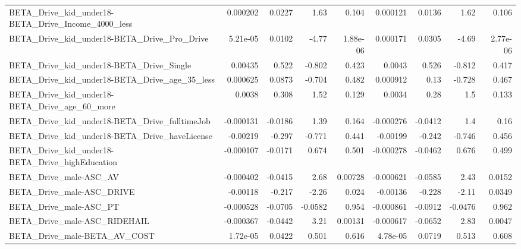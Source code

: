 \begin{tabular}{lrrrrrrrr}
BETA\_Drive\_kid\_under18-BETA\_Drive\_Income\_4000\_less &    0.000202 &       0.0227 &      1.63 &    0.104 &   0.000121 &      0.0136 &         1.62 &         0.106 \\
BETA\_Drive\_kid\_under18-BETA\_Drive\_Pro\_Drive        &    5.21e-05 &       0.0102 &     -4.77 & 1.88e-06 &   0.000171 &      0.0305 &        -4.69 &      2.77e-06 \\
BETA\_Drive\_kid\_under18-BETA\_Drive\_Single           &     0.00435 &        0.522 &    -0.802 &    0.423 &     0.0043 &       0.526 &       -0.812 &         0.417 \\
BETA\_Drive\_kid\_under18-BETA\_Drive\_age\_35\_less      &    0.000625 &       0.0873 &    -0.704 &    0.482 &   0.000912 &        0.13 &       -0.728 &         0.467 \\
BETA\_Drive\_kid\_under18-BETA\_Drive\_age\_60\_more      &      0.0038 &        0.308 &      1.52 &    0.129 &     0.0034 &        0.28 &          1.5 &         0.133 \\
BETA\_Drive\_kid\_under18-BETA\_Drive\_fulltimeJob      &   -0.000131 &      -0.0186 &      1.39 &    0.164 &  -0.000276 &     -0.0412 &          1.4 &          0.16 \\
BETA\_Drive\_kid\_under18-BETA\_Drive\_haveLicense      &    -0.00219 &       -0.297 &    -0.771 &    0.441 &   -0.00199 &      -0.242 &       -0.746 &         0.456 \\
BETA\_Drive\_kid\_under18-BETA\_Drive\_highEducation    &   -0.000107 &      -0.0171 &     0.674 &    0.501 &  -0.000278 &     -0.0462 &        0.676 &         0.499 \\
BETA\_Drive\_male-ASC\_AV                             &   -0.000402 &      -0.0415 &      2.68 &  0.00728 &  -0.000621 &     -0.0585 &         2.43 &        0.0152 \\
BETA\_Drive\_male-ASC\_DRIVE                          &    -0.00118 &       -0.217 &     -2.26 &    0.024 &   -0.00136 &      -0.228 &        -2.11 &        0.0349 \\
BETA\_Drive\_male-ASC\_PT                             &   -0.000528 &      -0.0705 &   -0.0582 &    0.954 &  -0.000861 &     -0.0912 &      -0.0476 &         0.962 \\
BETA\_Drive\_male-ASC\_RIDEHAIL                       &   -0.000367 &      -0.0442 &      3.21 &  0.00131 &  -0.000617 &     -0.0652 &         2.83 &        0.0047 \\
BETA\_Drive\_male-BETA\_AV\_COST                       &    1.72e-05 &       0.0422 &     0.501 &    0.616 &   4.78e-05 &      0.0719 &        0.513 &         0.608 \\

\end{tabular}
